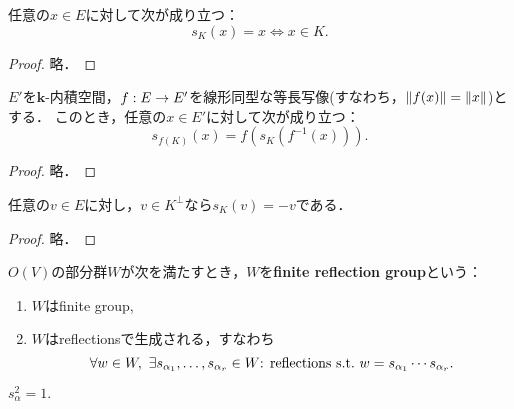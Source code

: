 \begin{thm}
  \label{thm:reflection_eq_self_iff}
  \leanok
  任意の$x \in E$に対して次が成り立つ：
  \begin{equation}
    s_K(x) = x \iff x \in K.
  \end{equation}
\end{thm}

\begin{proof}
  \leanok
  略．
\end{proof}

\begin{thm}
  \label{thm:reflection_map_apply}
  \leanok
  $E'$を$\bm{k}$-内積空間，$f : E \rightarrow E'$を線形同型な等長写像(すなわち，$\left\| f(x) \right\| = \left\| x \right\|$)とする．
  このとき，任意の$x \in E'$に対して次が成り立つ：
  \begin{equation}
    s_{f(K)}(x) = f(s_K(f^{-1}(x))).
  \end{equation}
\end{thm}

\begin{proof}
  \leanok
  略．
\end{proof}

\begin{thm}
  \label{thm:reflection_mem_subspace_orthogonalComplement_eq_neg}
  \leanok
  任意の$v \in E$に対し，$v \in K^\perp$なら$s_K(v) = -v$である．
\end{thm}

\begin{proof}
  \leanok
  略．
\end{proof}

\begin{defi}
  $O(V)$の部分群$W$が次を満たすとき，$W$を\textbf{finite reflection group}という：
  \begin{enumerate}[label=(\roman*)]
    \item $W$はfinite group,
    \item $W$はreflectionsで生成される，すなわち
    \begin{equation}
      \forall w \in W,\ \exists s_{\alpha_1}, \ldots, s_{\alpha_r} \in W \textrm{: reflections} \ \text{s.t.}\  w = s_{\alpha_1} \cdots s_{\alpha_r}.
    \end{equation}
  \end{enumerate}
\end{defi}

\begin{rem}
  $s_\alpha^2 = 1.$
\end{rem}

